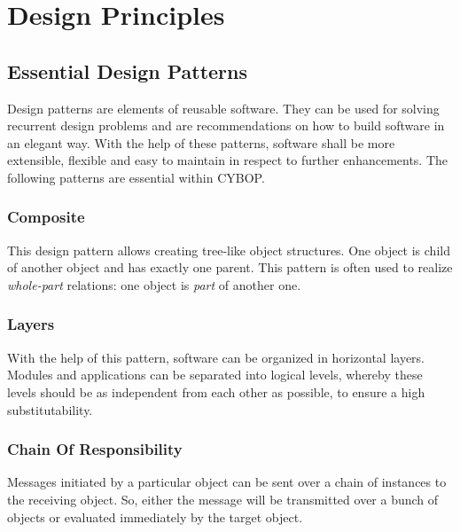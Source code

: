 \section{Design Principles}

\subsection{Essential Design Patterns \cite{ch:entwurfsmuster}}
Design patterns are elements of reusable software. They can be
used for solving recurrent design problems and are recommendations
on how to build software in an elegant way. With the help of these
patterns, software shall be more extensible, flexible and easy to
maintain in respect to further enhancements. The following
patterns are essential within CYBOP.

\subsubsection{Composite}
This design pattern allows creating tree-like object structures.
One object is child of another object and has exactly one parent.
This pattern is often used to realize \emph{whole-part} relations:
one object is \emph{part} of another one.

\subsubsection{Layers}
With the help of this pattern, software can be organized in
horizontal layers. Modules and applications can be separated into
logical levels, whereby these levels should be as independent from
each other as possible, to ensure a high substitutability.

\subsubsection{Chain Of Responsibility}
Messages initiated by a particular object can be sent over a chain of instances to the receiving
object. So, either the message will be transmitted over a bunch of objects or evaluated immediately
by the target object.

